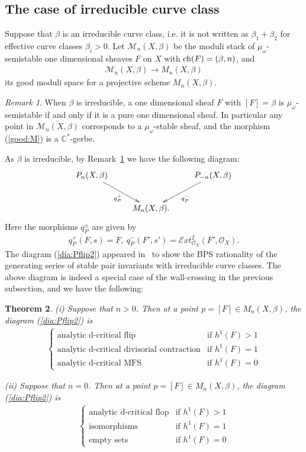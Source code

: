 \documentclass[11pt]{amsart}
\theoremstyle{plain}
\newtheorem{thm}{Theorem}[section]
\theoremstyle{definition}
\theoremstyle{remark}
\newtheorem{rmk}[thm]{Remark}
\newcommand{\eE}{\mathcal{E}}
\newcommand{\mM}{\mathcal{M}}
\newcommand{\oO}{\mathcal{O}}
\newcommand{\ch}{\mathop{\rm ch}\nolimits}
\begin{document}
\subsection{The case of irreducible curve class}
Suppose that $\beta$ is an irreducible curve class, i.e. 
it is not written as $\beta_1+\beta_2$ for 
effective curve classes $\beta_i>0$. 
Let $\mM_n(X, \beta)$ be the moduli stack of 
$\mu_{\omega}$-semistable one dimensional 
sheaves $F$ on $X$ with 
$\ch(F)=(\beta, n)$, and 
\begin{align}\label{good:M}
\mM_n(X, \beta) \to M_n(X, \beta)
\end{align}
its good moduli space
for a projective scheme $M_n(X, \beta)$. 
\begin{rmk}\label{rmk:irreducible}
When $\beta$ is irreducible, 
a one dimensional sheaf $F$
with $[F]=\beta$ is 
$\mu_{\omega}$-semistable 
if and only if it is a pure one dimensional 
sheaf. 
In particular 
any point in $\mM_n(X, \beta)$ corresponds to a 
$\mu_{\omega}$-stable sheaf, 
and the morphism (\ref{good:M}) 
is a $\mathbb{C}^{\ast}$-gerbe.  
\end{rmk}
As $\beta$ is irreducible, 
by Remark~\ref{rmk:irreducible}
we have the following diagram:
\begin{align}\label{dia:Pflip2}
\xymatrix{
P_n(X, \beta)  \ar[rd]_-{q_{P}^{+}}
 & & 
P_{-n}(X, \beta) 
\ar[ld]^-{q_{P}^{-}} \\
& M_n(X, \beta). &
}
\end{align}
Here the morphisms 
$q_P^{\pm}$ are given by
\begin{align*}
q_P^{+}(F, s)=F, \ 
q_P^{-}(F', s')=\eE xt^2_{\oO_X}(F', \oO_X). 
\end{align*}
The diagram (\ref{dia:Pflip2}) appeared in~\cite{PT3} 
to show the BPS rationality of the generating series of 
stable pair invariants with irreducible curve classes. 
The above diagram is indeed a special case of the wall-crossing 
in the previous subsection, and we have the following: 
\begin{thm}\label{thm:irreducible}
(i) Suppose that $n>0$. 
Then at a point $p=[F] \in M_n(X, \beta)$, 
the diagram (\ref{dia:Pflip2})
is 
\begin{align}\label{PT:irreducible}
\left\{ \begin{array}{ll}
\mbox{analytic d-critical flip} & \mbox{if } h^1(F)>1 \\
\mbox{analytic d-critical divisorial contraction} & \mbox{if } h^1(F)=1 \\
\mbox{analytic d-critical MFS} & \mbox{if } h^1(F)=0
\end{array}  \right. 
\end{align}

(ii) Suppose that $n=0$. Then at a point $p=[F] \in M_n(X, \beta)$, 
the diagram (\ref{dia:Pflip2}) is 
\begin{align*}
\left\{ \begin{array}{ll}
\mbox{analytic d-critical flop} & \mbox{if } h^1(F)>1 \\
\mbox{isomorphisms}  & \mbox{if } h^1(F)=1 \\
\mbox{empty sets}  & \mbox{if } h^1(F)=0
\end{array}  \right. 
\end{align*}
\end{thm}
\end{document}
